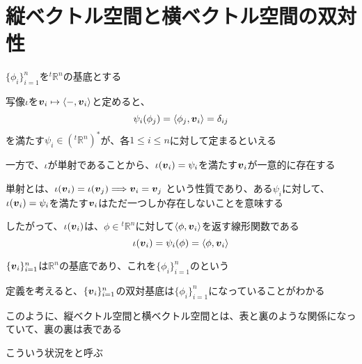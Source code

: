 \documentclass[../../../topic_linear-algebra]{subfiles}
\begin{document}
\sectionline
\section{縦ベクトル空間と横ベクトル空間の双対性}

$\{ \phi_i \}_{i=1}^n$を${}^t\mathbb{R}^n$の基底とする

\br

写像$\iota$を$\vb*{v}_i \mapsto \langle -, \vb*{v}_i \rangle$と定めると、
\begin{equation*}
  \psi_i(\phi_j) = \langle \phi_j, \vb*{v}_i \rangle = \delta_{ij}
\end{equation*}
を満たす$\psi_i \in ({}^t\mathbb{R}^n)^*$が、各$1 \leq i \leq n$に対して定まるといえる

\br

一方で、$\iota$が単射であることから、$\iota(\vb*{v}_i) = \psi_i$を満たす$\vb*{v}_i$が一意的に存在する

単射とは、$\iota(\vb*{v}_i) = \iota(\vb*{v}_j) \Longrightarrow \vb*{v}_i = \vb*{v}_j$
という性質であり、ある$\psi_i$に対して、$\iota(\vb*{v}_i) = \psi_i$を満たす$\vb*{v}_i$はただ一つしか存在しないことを意味する

\br

したがって、$\iota(\vb*{v}_i)$は、$\phi \in {}^t\mathbb{R}^n$に対して$\langle \phi, \vb*{v}_i \rangle$を返す線形関数である
\begin{equation*}
  \iota(\vb*{v}_i) = \psi_i(\phi) = \langle \phi, \vb*{v}_i \rangle
\end{equation*}

\br

$\{ \vb*{v}_i \}_{i=1}^n$は$\mathbb{R}^n$の基底であり、これを$\{ \phi_i \}_{i=1}^n$のという

\br

定義を考えると、$\{ \vb*{v}_i \}_{i=1}^n$の双対基底は$\{ \phi_i \}_{i=1}^n$になっていることがわかる

\br

このように、縦ベクトル空間と横ベクトル空間とは、表と裏のような関係になっていて、裏の裏は表である

こういう状況をと呼ぶ
\end{document}
